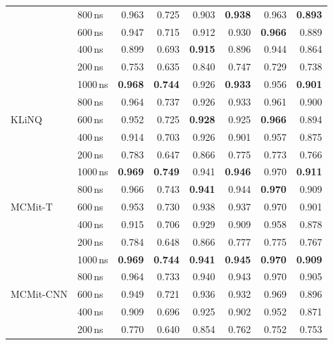 \begin{longtable}{ll rrrrr r}
 & 800\,ns & 0.963 & 0.725 & 0.903 & \textbf{0.938} & 0.963 & \textbf{0.893} \\
 & 600\,ns & 0.947 & 0.715 & 0.912 & 0.930 & \textbf{0.966} & 0.889 \\
 & 400\,ns & 0.899 & 0.693 & \textbf{0.915} & 0.896 & 0.944 & 0.864 \\
 & 200\,ns & 0.753 & 0.635 & 0.840 & 0.747 & 0.729 & 0.738 \\
\midrule
\multirow{5}{*}{KLiNQ} & 1000\,ns & \textbf{0.968} & \textbf{0.744} & 0.926 & \textbf{0.933} & 0.956 & \textbf{0.901} \\
 & 800\,ns & 0.964 & 0.737 & 0.926 & 0.933 & 0.961 & 0.900 \\
 & 600\,ns & 0.952 & 0.725 & \textbf{0.928} & 0.925 & \textbf{0.966} & 0.894 \\
 & 400\,ns & 0.914 & 0.703 & 0.926 & 0.901 & 0.957 & 0.875 \\
 & 200\,ns & 0.783 & 0.647 & 0.866 & 0.775 & 0.773 & 0.766 \\
\midrule
\multirow{5}{*}{MCMit-T} & 1000\,ns & \cellcolor{blue!12}\textbf{0.969} & \cellcolor{blue!12}\textbf{0.749} & 0.941 & \cellcolor{blue!12}\textbf{0.946} & 0.970 & \cellcolor{blue!12}\textbf{0.911} \\
 & 800\,ns & 0.966 & 0.743 & \cellcolor{blue!12}\textbf{0.941} & 0.944 & \cellcolor{blue!12}\textbf{0.970} & 0.909 \\
 & 600\,ns & 0.953 & 0.730 & 0.938 & 0.937 & 0.970 & 0.901 \\
 & 400\,ns & 0.915 & 0.706 & 0.929 & 0.909 & 0.958 & 0.878 \\
 & 200\,ns & 0.784 & 0.648 & 0.866 & 0.777 & 0.775 & 0.767 \\
\midrule
\multirow{5}{*}{MCMit-CNN} & 1000\,ns & \textbf{0.969} & \textbf{0.744} & \textbf{0.941} & \textbf{0.945} & \textbf{0.970} & \textbf{0.909} \\
 & 800\,ns & 0.964 & 0.733 & 0.940 & 0.943 & 0.970 & 0.905 \\
 & 600\,ns & 0.949 & 0.721 & 0.936 & 0.932 & 0.969 & 0.896 \\
 & 400\,ns & 0.909 & 0.696 & 0.925 & 0.902 & 0.952 & 0.871 \\
 & 200\,ns & 0.770 & 0.640 & 0.854 & 0.762 & 0.752 & 0.753 \\
\bottomrule
\end{longtable}
